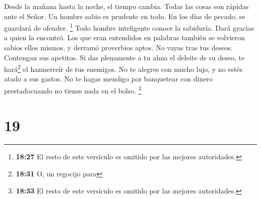  Desde la mañana hasta la noche, el tiempo cambia. Todas
las cosas son rápidas ante el Señor.  Un hombre sabio es
prudente en todo. En los días de pecado, se guardará de ofender.
\footnote{\textbf{18:27} El resto de este versículo es omitido por las
  mejores autoridades.}  Todo hombre inteligente conoce
la sabiduría. Dará gracias a quien la encontró.  Los que
eran entendidos en palabras también se volvieron sabios ellos mismos, y
derramó proverbios aptos.  No vayas tras tus deseos.
Contengan sus apetitos.  Si das plenamente a tu alma el
deleite de su deseo, te hará\footnote{\textbf{18:31} O, un regocijo para}
el hazmerreír de tus enemigos.  No te alegres con mucho
lujo, y no estés atado a sus gastos.  No te hagas mendigo
por banquetear con dinero prestadocuando no tienes nada en el bolso.
\footnote{\textbf{18:33} El resto de este versículo es omitido por las
  mejores autoridades.}

\hypertarget{section-18}{%
\section{19}\label{section-18}}

